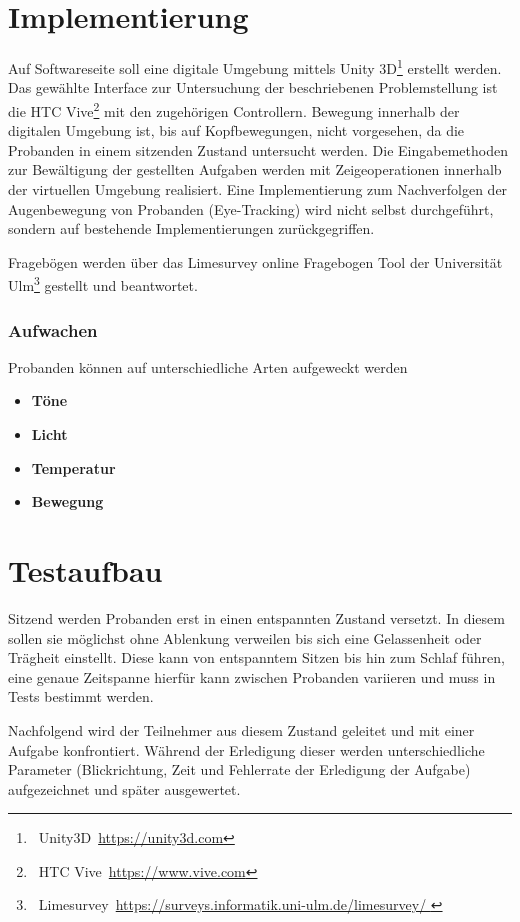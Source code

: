 \documentclass[a4paper, 11pt]{article}
\begin{document}
\section*{Implementierung}
Auf Softwareseite soll eine digitale Umgebung mittels Unity 3D\footnote{~Unity3D~\url{https://unity3d.com}} erstellt werden. Das gewählte Interface zur Untersuchung der beschriebenen Problemstellung ist die HTC Vive\footnote{~HTC Vive~\url{https://www.vive.com}} mit den zugehörigen Controllern. Bewegung innerhalb der digitalen Umgebung ist, bis auf Kopfbewegungen, nicht vorgesehen, da die Probanden in einem sitzenden Zustand untersucht werden. Die Eingabemethoden zur Bewältigung der gestellten Aufgaben werden mit Zeigeoperationen innerhalb der virtuellen Umgebung realisiert. Eine Implementierung zum Nachverfolgen der Augenbewegung von Probanden (Eye-Tracking) wird nicht selbst durchgeführt, sondern auf bestehende Implementierungen zurückgegriffen. 

Fragebögen werden über das Limesurvey online Fragebogen Tool der Universität Ulm\footnote{~Limesurvey~\url{https://surveys.informatik.uni-ulm.de/limesurvey/
}} gestellt und beantwortet. 

\subsubsection*{Aufwachen}
Probanden können auf unterschiedliche Arten aufgeweckt werden~\cite{jewett1999time, ferrara2000sleep}
\begin{itemize}
    \item \textbf{Töne}
    \item \textbf{Licht}
    \item \textbf{Temperatur}
    \item \textbf{Bewegung}
\end{itemize}

\section*{Testaufbau}
Sitzend werden Probanden erst in einen entspannten Zustand versetzt. In diesem sollen sie möglichst ohne Ablenkung verweilen bis sich eine Gelassenheit oder Trägheit einstellt. Diese kann von entspanntem Sitzen bis hin zum Schlaf führen, eine genaue Zeitspanne hierfür kann zwischen Probanden variieren und muss in Tests bestimmt werden.

Nachfolgend wird der Teilnehmer aus diesem Zustand geleitet und mit einer Aufgabe konfrontiert. Während der Erledigung dieser werden unterschiedliche Parameter (Blickrichtung, Zeit und Fehlerrate der Erledigung der Aufgabe) aufgezeichnet und später ausgewertet.
\end{document}
